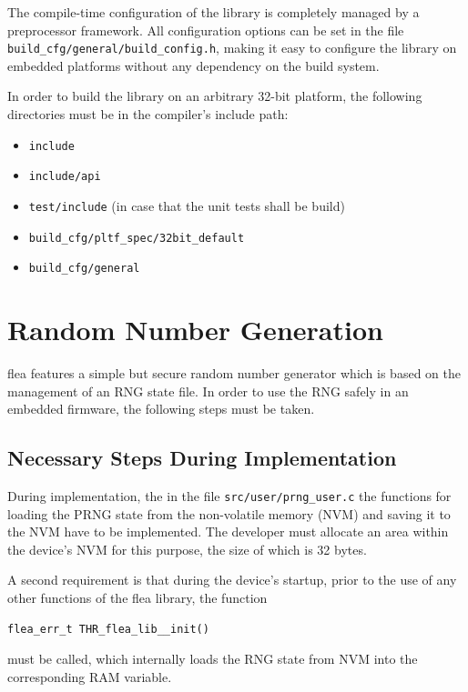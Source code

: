 \documentclass[a4paper,11pt]{scrartcl}
\begin{document}
  The compile-time configuration of the library is completely managed by a
  preprocessor framework. All configuration options can be set in the file
  \verb#build_cfg/general/build_config.h#, making it easy to configure the
  library on embedded platforms without any dependency on the build system.

  In order to build the library on an arbitrary 32-bit platform, the following
  directories must be in the compiler's include path:
  \begin{itemize}
    \item \verb#include#
    \item \verb#include/api#
    \item \verb#test/include# (in case that the unit tests shall be build)
    \item \verb#build_cfg/pltf_spec/32bit_default#
    \item \verb#build_cfg/general#
  \end{itemize}

\section{Random Number Generation }
\label{secRng}

flea features a simple but secure random number generator which is based on
the management of an RNG state file. In order to use the RNG safely in an
embedded firmware, the following steps must be taken. 

\subsection{Necessary Steps During Implementation}
During implementation, the in the file \verb#src/user/prng_user.c# the functions
for loading the PRNG state from the non-volatile memory (NVM)  and saving it to the NVM have to be
implemented. The developer must allocate an area within the device's NVM for
this purpose, the size of which is 32 bytes.

A second requirement is that during the device's startup, prior to the use of any
other functions of the flea library, the function 
\begin{verbatim}
flea_err_t THR_flea_lib__init()
\end{verbatim}
must be called, which internally loads the RNG state from NVM into the
corresponding RAM variable.
\end{document}
